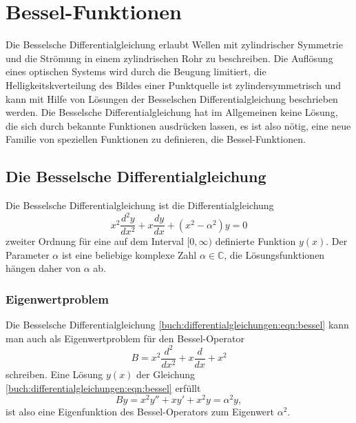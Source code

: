 %
%
%
\section{Bessel-Funktionen
\label{buch:differntialgleichungen:section:bessel}}
Die Besselsche Differentialgleichung
erlaubt Wellen mit zylindrischer
Symmetrie und die Strömung in einem zylindrischen Rohr zu beschreiben.
Die Auflösung eines optischen Systems wird durch die Beugung limitiert,
die Helligkeitskverteilung des Bildes einer Punktquelle ist
zylindersymmetrisch und kann mit Hilfe von Lösungen der Besselschen
Differentialgleichung beschrieben werden.
Die Besselsche Differentialgleichung hat im Allgemeinen keine Lösung,
die sich durch bekannte Funktionen ausdrücken lassen, es ist also
nötig, eine neue Familie von speziellen Funktionen zu definieren,
die Bessel-Funktionen.

%
%
\subsection{Die Besselsche Differentialgleichung}
Die Besselsche Differentialgleichung ist die Differentialgleichung
\begin{equation}
x^2\frac{d^2y}{dx^2} + x\frac{dy}{dx} + (x^2-\alpha^2)y = 0
\label{buch:differentialgleichungen:eqn:bessel}
\end{equation}
%
%
zweiter Ordnung
für eine auf dem Interval $[0,\infty)$ definierte Funktion $y(x)$.
Der Parameter $\alpha$ ist eine beliebige komplexe Zahl $\alpha\in \mathbb{C}$,
die Lösungsfunktionen hängen daher von $\alpha$ ab.

%
%
\subsubsection{Eigenwertproblem}
Die Besselsche Differentialgleichung
\eqref{buch:differentialgleichungen:eqn:bessel}
kann man auch als Eigenwertproblem für den Bessel-Operator
%
%
\begin{equation}
B = x^2\frac{d^2}{dx^2} + x\frac{d}{dx} + x^2
\label{buch:differentialgleichungen:bessel-operator}
\end{equation}
schreiben.
Eine Lösung $y(x)$ der Gleichung
\eqref{buch:differentialgleichungen:eqn:bessel}
erfüllt
\[
By
=
x^2y''+xy'+x^2y
=\alpha^2 y,
\]
ist also eine Eigenfunktion des Bessel-Operators zum Eigenwert
$\alpha^2$.

